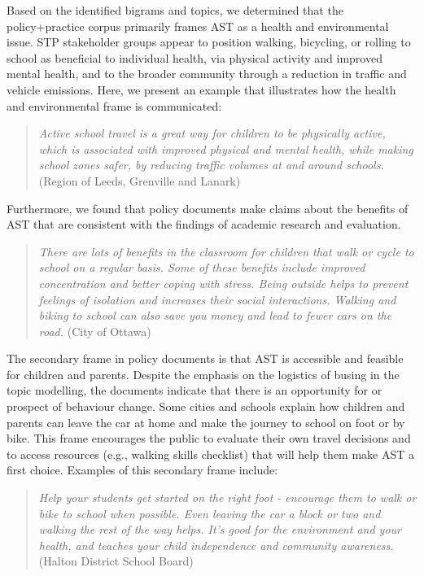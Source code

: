 \documentclass[preprint, 3p,
authoryear]{elsarticle} %
\begin{document}
Based on the identified bigrams and topics, we determined that the
policy+practice corpus primarily frames AST as a health and
environmental issue. STP stakeholder groups appear to position walking,
bicycling, or rolling to school as beneficial to individual health, via
physical activity and improved mental health, and to the broader
community through a reduction in traffic and vehicle emissions. Here, we
present an example that illustrates how the health and environmental
frame is communicated:

\begin{quote}
\emph{Active school travel is a great way for children to be physically
active, which is associated with improved physical and mental health,
while making school zones safer, by reducing traffic volumes at and
around schools.}(Region of Leeds, Grenville and Lanark)
\end{quote}

Furthermore, we found that policy documents make claims about the
benefits of AST that are consistent with the findings of academic
research and evaluation.

\begin{quote}
\emph{There are lots of benefits in the classroom for children that walk
or cycle to school on a regular basis. Some of these benefits include
improved concentration and better coping with stress. Being outside
helps to prevent feelings of isolation and increases their social
interactions. Walking and biking to school can also save you money and
lead to fewer cars on the road.} (City of Ottawa)
\end{quote}

The secondary frame in policy documents is that AST is accessible and
feasible for children and parents. Despite the emphasis on the logistics
of busing in the topic modelling, the documents indicate that there is
an opportunity for or prospect of behaviour change. Some cities and
schools explain how children and parents can leave the car at home and
make the journey to school on foot or by bike. This frame encourages the
public to evaluate their own travel decisions and to access resources
(e.g., walking skills checklist) that will help them make AST a first
choice. Examples of this secondary frame include:

\begin{quote}
\emph{Help your students get started on the right foot - encourage them
to walk or bike to school when possible. Even leaving the car a block or
two and walking the rest of the way helps. It's good for the environment
and your health, and teaches your child independence and community
awareness.} (Halton District School Board)
\end{quote}
\end{document}
